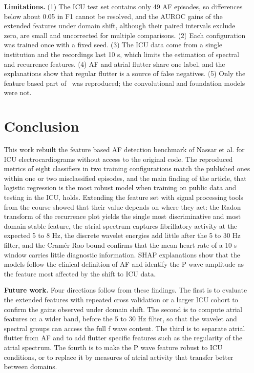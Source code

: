 \documentclass[conference,a4paper]{IEEEtran}
\begin{document}
\noindent\textbf{Limitations.} (1) The ICU test set contains only 49 AF episodes, so differences below about 0.05 in F1 cannot be resolved, and the AUROC gains of the extended features under domain shift, although their paired intervals exclude zero, are small and uncorrected for multiple comparisons. (2) Each configuration was trained once with a fixed seed. (3) The ICU data come from a single institution and the recordings last 10 s, which limits the estimation of spectral and recurrence features. (4) AF and atrial flutter share one label, and the explanations show that regular flutter is a source of false negatives. (5) Only the feature based part of~\cite{nassar2025} was reproduced; the convolutional and foundation models were not.

\section{Conclusion}
\label{sec:conclusion}

This work rebuilt the feature based AF detection benchmark of Nassar et al. for ICU electrocardiograms without access to the original code. The reproduced metrics of eight classifiers in two training configurations match the published ones within one or two misclassified episodes, and the main finding of the article, that logistic regression is the most robust model when training on public data and testing in the ICU, holds. Extending the feature set with signal processing tools from the course showed that their value depends on where they act: the Radon transform of the recurrence plot yields the single most discriminative and most domain stable feature, the atrial spectrum captures fibrillatory activity at the expected 5 to 8 Hz, the discrete wavelet energies add little after the 5 to 30 Hz filter, and the Cramér Rao bound confirms that the mean heart rate of a 10 s window carries little diagnostic information. SHAP explanations show that the models follow the clinical definition of AF and identify the P wave amplitude as the feature most affected by the shift to ICU data.

\noindent\textbf{Future work.} Four directions follow from these findings. The first is to evaluate the extended features with repeated cross validation or a larger ICU cohort to confirm the gains observed under domain shift. The second is to compute atrial features on a wider band, before the 5 to 30 Hz filter, so that the wavelet and spectral groups can access the full f wave content. The third is to separate atrial flutter from AF and to add flutter specific features such as the regularity of the atrial spectrum. The fourth is to make the P wave feature robust to ICU conditions, or to replace it by measures of atrial activity that transfer better between domains.
\end{document}
